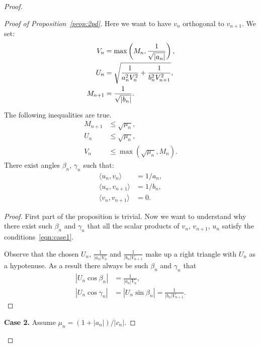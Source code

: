 \begin{proof}
\begin{proof}[Proof of Proposition~\ref{prop:2pd}]
          Here we want to have $v_n$ orthogonal to $v_{n+1}$.
          We set:
          \begin{align*}
              V_n &= \max\left(M_n, \frac{1}{\sqrt{\smash[b]{|a_n|}}}\right),\\
              U_n &= \sqrt{\frac{1}{a_n^2 V_n^2} + \frac{1}{b_n^2 V_{n+1}^2}},\\
              M_{n+1} &= \frac{1}{\sqrt{\smash[b]{|b_n|}}}.
          \end{align*}
          \begin{prop}
            The following inequalities are true.
            \begin{align*}
              M_{n+1} &\leq \sqrt{\mu_n},\\
              U_n &\leq \sqrt{\mu_n},\\
              V_n &\leq \max(\sqrt{\mu_n}, M_n).
            \end{align*}
            There exist angles $\beta_n$, $\gamma_n$ such that:
            \begin{equation}
              \label{eqn:case1}
              \begin{aligned}
                \langle u_n, v_n \rangle &= 1/a_n,\\
                \langle u_n, v_{n+1} \rangle &= 1/b_n,\\
                \langle v_n, v_{n+1} \rangle &= 0.
              \end{aligned}
            \end{equation}
          \end{prop}
          \begin{proof}
            First part of the proposition is trivial.
            Now we want to understand why there exist such $\beta_n$ and $\gamma_n$ that all the scalar products of
              $v_n$, $v_{n+1}$, $u_n$ satisfy the conditions~\eqref{eqn:case1}.

            Observe that the chosen $U_n$, $\frac{1}{|a_n| V_n}$ and $\frac{1}{|b_n| V_{n+1}}$
              make up a right triangle with $U_n$ as a hypotenuse.
            As a result there always be such $\beta_n$ and $\gamma_n$ that
            \begin{align*}
              |U_n \cos{\beta_n}| &= \frac{1}{|a_n|V_n},\\
              \left|U_n \cos{\gamma_n}\right| &= \left|U_n \sin{\beta_n}\right| = \frac{1}{|b_n|V_{n+1}}.
            \end{align*}
          \end{proof}
        \noindent\textbf{Case 2.} Assume $\mu_n = (1 + |a_n|)/|c_n|$.


\end{proof}
\end{proof}
